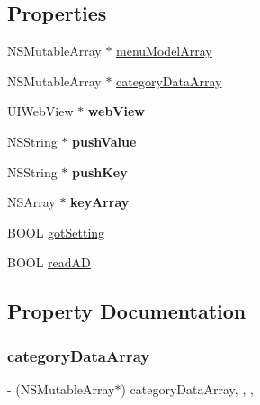 \subsection*{Properties}
\begin{DoxyCompactItemize}
\item 
N\+S\+Mutable\+Array $\ast$ \mbox{\hyperlink{category_app_delegate_07_08_a195bde1c44eefd882f0f098bcdfde7d0}{menu\+Model\+Array}}
\item 
N\+S\+Mutable\+Array $\ast$ \mbox{\hyperlink{category_app_delegate_07_08_a6c663a35a0b64d42fb4ae1aa6a758a66}{category\+Data\+Array}}
\item 
\mbox{\label{category_app_delegate_07_08_a17a7a57e9861795e6d030e15a2f5ab43}} 
U\+I\+Web\+View $\ast$ {\bfseries web\+View}
\item 
\mbox{\label{category_app_delegate_07_08_a6838e712590ee53de6f2445def339ed7}} 
N\+S\+String $\ast$ {\bfseries push\+Value}
\item 
\mbox{\label{category_app_delegate_07_08_a2fb7550203045cfc7ba5400cf47f75b6}} 
N\+S\+String $\ast$ {\bfseries push\+Key}
\item 
\mbox{\label{category_app_delegate_07_08_ad7b6c7f14963ddef9521c9e4ade9943e}} 
N\+S\+Array $\ast$ {\bfseries key\+Array}
\item 
B\+O\+OL \mbox{\hyperlink{category_app_delegate_07_08_a607d159c9d9d8f9b7bdefe50873efa01}{got\+Setting}}
\item 
B\+O\+OL \mbox{\hyperlink{category_app_delegate_07_08_a70da904910d509953d9f9156568f268b}{read\+AD}}
\end{DoxyCompactItemize}


\subsection{Property Documentation}
\mbox{\label{category_app_delegate_07_08_a6c663a35a0b64d42fb4ae1aa6a758a66}} 
\subsubsection{\texorpdfstring{category\+Data\+Array}{categoryDataArray}}
{\footnotesize\ttfamily -\/ (N\+S\+Mutable\+Array$\ast$) category\+Data\+Array\hspace{0.3cm}{\ttfamily [read]}, {\ttfamily [write]}, {\ttfamily [nonatomic]}, {\ttfamily [retain]}}

